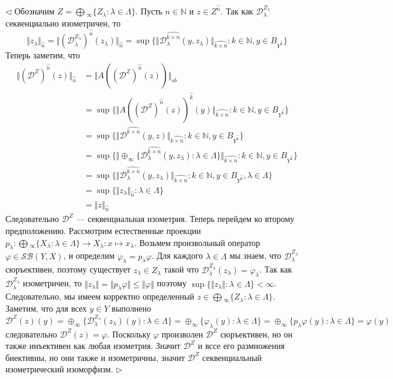 \documentclass[12pt]{article}
\newenvironment{proof}{\par $\triangleleft$}{$\triangleright$}
\begin{document}
\begin{proof} Обозначим $Z=\bigoplus{}_\infty\{Z_\lambda:\lambda\in\Lambda\}$. Пусть $n\in\mathbb{N}$ и $z\in Z^{\wideparen{n}}$. Так как $\mathcal{D}_\lambda^{Z_\lambda}$ секвенциально изометричен, то
$$
\Vert z_\lambda\Vert_{\wideparen{n}}
=\Vert (\mathcal{D}_\lambda^{Z_\lambda})^{\wideparen{n}}(z_\lambda)\Vert_{\wideparen{n}}
=\sup\{\Vert \mathcal{D}_\lambda^{\wideparen{k\times n}}(y,z_\lambda)\Vert_{\wideparen{k\times n}}:k\in\mathbb{N},y\in B_{Y^{\wideparen{k}}}\}
$$
Теперь заметим, что
$$
\begin{aligned}
\Vert(\mathcal{D}^Z)^{\wideparen{n}}(z)\Vert_{\wideparen{n}}
&=\Vert A((\mathcal{D}^Z)^{\wideparen{n}}(z))\Vert_{sb}\\
&=\sup\{\Vert A((\mathcal{D}^Z)^{\wideparen{n}}(z))^{\wideparen{k}}(y)\Vert_{\wideparen{k\times n}}:k\in\mathbb{N},y\in B_{Y^{\wideparen{k}}}\}\\
&=\sup\{\Vert \mathcal{D}^{\wideparen{k\times n}}(y,z)\Vert_{\wideparen{k\times n}}:k\in\mathbb{N},y\in B_{Y^{\wideparen{k}}}\}\\
&=\sup\{\Vert \oplus_\infty\{\mathcal{D}_\lambda^{\wideparen{k\times n}}(y,z_\lambda):\lambda\in\Lambda\}\Vert_{\wideparen{k\times n}}:k\in\mathbb{N},y\in B_{Y^{\wideparen{k}}}\}\\
&=\sup\{\Vert \mathcal{D}_\lambda^{\wideparen{k\times n}}(y,z_\lambda)\Vert_{\wideparen{k\times n}}:k\in\mathbb{N},y\in B_{Y^{\wideparen{k}}},\lambda\in\Lambda\}\\
&=\sup\{\Vert z_\lambda\Vert_{\wideparen{n}}:\lambda\in\Lambda\}\\
&=\Vert z\Vert_{\wideparen{n}}
\end{aligned}
$$
Следовательно $\mathcal{D}^Z$ --- секвенциальная изометрия. Теперь перейдем ко второму предположению. Рассмотрим естественные проекции $p_\lambda:\bigoplus{}_\infty\{X_\lambda:\lambda\in\Lambda\}\to X_\lambda:x\mapsto x_\lambda$. Возьмем произвольный оператор $\varphi\in\mathcal{SB}(Y,X)$, и определим $\varphi_\lambda=p_\lambda\varphi$. Для каждого $\lambda\in\Lambda$ мы знаем, что $\mathcal{D}_\lambda^{Z_\lambda}$ сюръективен, поэтому существует $z_\lambda\in Z_\lambda$ такой что $\mathcal{D}_\lambda^{Z_\lambda}(z_\lambda)=\varphi_\lambda$. Так как $\mathcal{D}_\lambda^{Z_\lambda}$ изометричен, то $\Vert z_\lambda\Vert=\Vert p_\lambda\varphi\Vert\leq\Vert \varphi\Vert$ поэтому $\sup\{\Vert z_\lambda\Vert:\lambda\in\Lambda\}<\infty$. Следовательно, мы имеем корректно определенный $z\in\bigoplus{}_\infty\{Z_\lambda:\lambda\in\Lambda\}$. Заметим, что для всех $y\in Y$ выполнено
$$
\mathcal{D}^{Z}(z)(y)
=\oplus_\infty\{\mathcal{D}_\lambda^{Z_\lambda}(z_\lambda)(y):\lambda\in\Lambda\}
=\oplus_\infty\{\varphi_\lambda(y):\lambda\in\Lambda\}
=\oplus_\infty\{p_\lambda\varphi(y):\lambda\in\Lambda\}
=\varphi(y)
$$
следовательно $\mathcal{D}^Z(z)=\varphi$. Поскольку $\varphi$ произволен $\mathcal{D}^Z$ сюръективен, но он также инъективен как любая изометрия. Значит $\mathcal{D}^Z$ и вссе его размножения биективны, но они также и изометричны, значит $\mathcal{D}^Z$ секвенциальный изометрический изоморфизм.
\end{proof}
\end{document}
